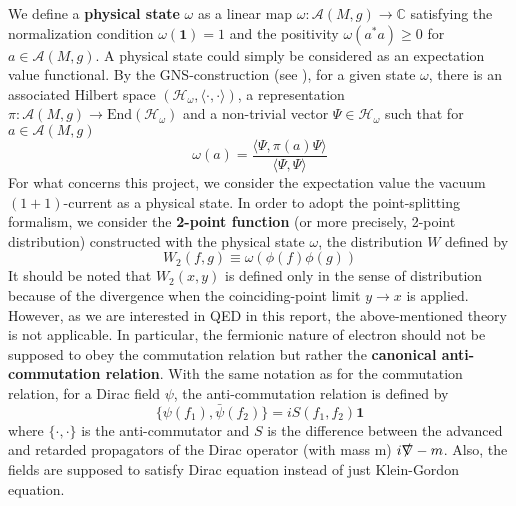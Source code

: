 We define a \textbf{physical state} $\omega$ as a linear map
$\omega: \mathscr{A}(M,g) \rightarrow \mathbb{C}$ satisfying the normalization condition $\omega(\mathbf{1}) = 1$ and the positivity $\omega(a^*a) \geq 0$ for $a\in\mathscr{A}(M,g)$.
A physical state could simply be considered as an expectation value functional. 
By the GNS-construction (see \eg\cite{bar2009quantum}), 
for a given state $\omega$, there is an associated Hilbert space $(\mathscr{H}_\omega, \langle \cdot, \cdot \rangle)$, a representation $\pi : \mathscr{A}(M,g)\rightarrow \mathrm{End}(\mathscr{H}_\omega)$ and a non-trivial vector $\Psi \in \mathscr{H}_\omega$ such that for $a \in \mathscr{A}(M,g)$
\begin{equation*}
\omega(a) = \frac{\langle \Psi, \pi(a)\Psi\rangle}{\langle \Psi, \Psi \rangle}
\end{equation*}
For what concerns this project, we consider the expectation value the vacuum $(1+1)$-current as a physical state.
%
In order to adopt the point-splitting formalism, 
we consider the \textbf{2-point function} (or more precisely, 2-point distribution) constructed with the physical state $\omega$, 
\ie the distribution $W$ defined by 
\begin{equation*}
W_2(f, g ) \equiv \omega(\phi(f) \phi(g))
\end{equation*}
It should be noted that $W_2(x,y)$ is defined only in the sense of distribution because of the divergence when the coinciding-point limit $y\rightarrow x$ is applied.
However, as we are interested in QED in this report, the above-mentioned theory is not applicable. 
In particular, the fermionic nature of electron should not be supposed to obey the commutation relation but rather the \textbf{canonical anti-commutation relation}.
With the same notation as for the commutation relation, 
for a Dirac field $\psi$, the anti-commutation relation is defined by
\begin{equation*}
\{\psi(f_1), \bar{\psi}(f_2)\} = i S(f_1, f_2) \mathbf{1}
\end{equation*}
where $\{\cdot, \cdot\}$ is the anti-commutator and $S$ is the difference between the advanced and retarded propagators of the Dirac operator (with mass m) $i\slashed{\nabla} - m$.
Also, the fields are supposed to satisfy Dirac equation instead of just Klein-Gordon equation. 
